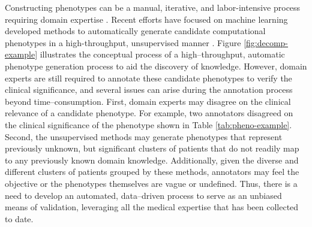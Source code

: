 \documentclass{sig-alternate-05-2015}
\begin{document}
Constructing phenotypes can be a manual, iterative, and labor-intensive process requiring domain expertise \cite{carroll2011naive,chen2013applying,hripcsak2013next}. 
Recent efforts have focused on machine learning developed methods to automatically generate candidate computational phenotypes in a high-throughput, unsupervised manner \cite{Ho:2014jc,Ho:2014da, hu2015scalable, wang2015rubik,Yu:2015fj}.
Figure \ref{fig:decomp-example} illustrates the conceptual process of a high--throughput, automatic phenotype generation process \cite{hripcsak2013next} to aid the discovery of knowledge.
However, domain experts are still required to annotate these candidate phenotypes to verify the clinical significance, and several issues can arise during the annotation process beyond time--consumption.
First, domain experts may disagree on the clinical relevance of a candidate phenotype. 
For example, two annotators disagreed on the clinical significance of the phenotype shown in Table \ref{tab:pheno-example}.
Second, the unsupervised methods may generate phenotypes that represent previously unknown, but significant clusters of patients that do not readily map to any previously known domain knowledge.
Additionally, given the diverse and different clusters of patients grouped by these methods, annotators may feel the objective or the phenotypes themselves are vague or undefined.
Thus, there is a need to develop an automated, data--driven process to serve as an unbiased means of validation, leveraging all the medical expertise that has been collected to date.
\end{document}
